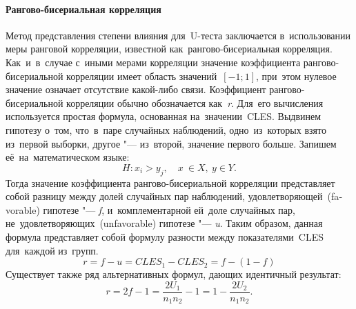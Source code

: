 \documentclass[]{scrreprt}
\begin{document}
\paragraph{Рангово-бисериальная корреляция}
Метод представления степени влияния для~U-теста заключается в~использовании меры ранговой корреляции, известной как~рангово-бисериальная корреляция. Как~и~в~случае с~иными мерами корреляции значение коэффициента рангово-бисериальной корреляции имеет область значений~${\textstyle [-1;1]}$, при~этом нулевое значение означает отсутствие какой-либо связи. Коэффициент рангово-бисериальной корреляции обычно обозначается как~\textit{r}. Для~его вычисления используется простая формула, основанная на~значении~CLES. Выдвинем гипотезу о~том, что~в~паре случайных наблюдений, одно~из~которых взято из~первой выборки, другое "--- из~второй, значение первого больше. Запишем её~на~математическом языке:
\begin{equation}\label{eq:RBC-hypothesis}
H: x_{i} > y_{j}, \quad x \ \in X,\ y \in Y.
\end{equation} 
Тогда значение коэффициента рангово-бисериальной корреляции представляет собой разницу между долей случайных пар наблюдений, удовлетворяющей~(\foreignlanguage{english}{favorable}) гипотезе "--- \textit{f}, и~комплементарной ей~доле случайных пар, не~удовлетворяющих~(\foreignlanguage{english}{unfavorable}) гипотезе "--- \textit{u}. Таким образом, данная формула представляет собой формулу разности между показателями~CLES для~каждой из~групп.
\begin{equation}\label{eq:RBC-formula-1}
r = f - u = CLES_{1} - CLES_{2} = f - (1 - f)
\end{equation}
Существует также ряд альтернативных формул, дающих идентичный результат:
\begin{equation}\label{eq:RBC-formula-2}
r = 2f -1 = \frac{2U_{1}}{n_{1}n_{2}}-1 = 1 - \frac{2U_{2}}{n_{1}n_{2}}.
\end{equation}	
\end{document}
